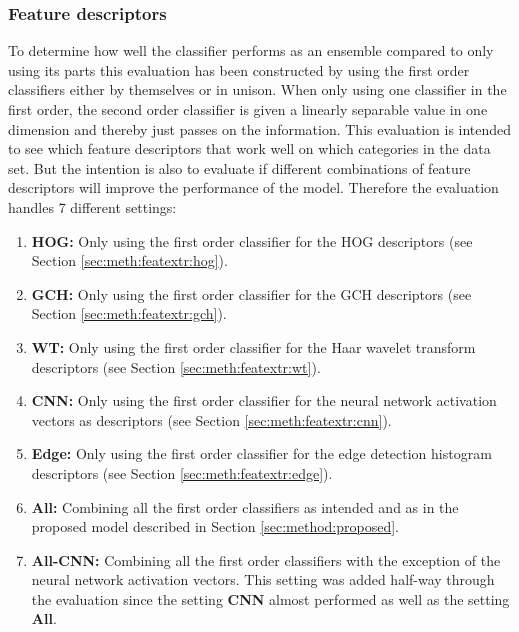 \subsubsection{Feature descriptors}
\label{sec:method:eval:param:features}
To determine how well the classifier performs as an ensemble compared to only using its parts this evaluation has been constructed by using the first order classifiers either by themselves or in unison. When only using one classifier in the first order, the second order classifier is given a linearly separable value in one dimension and thereby just passes on the information. This evaluation is intended to see which feature descriptors that work well on which categories in the data set. But the intention is also to evaluate if different combinations of feature descriptors will improve the performance of the model. 
Therefore the evaluation handles 7 different settings: 
\begin{enumerate}
	\item \textbf{HOG:} Only using the first order classifier for the HOG descriptors (see Section \ref{sec:meth:featextr:hog}).
	\item \textbf{GCH:} Only using the first order classifier for the GCH descriptors (see Section \ref{sec:meth:featextr:gch}).
	\item \textbf{WT:} Only using the first order classifier for the Haar wavelet transform descriptors (see Section \ref{sec:meth:featextr:wt}).
	\item \textbf{CNN:} Only using the first order classifier for the neural network activation vectors as descriptors (see Section \ref{sec:meth:featextr:cnn}).
	\item \textbf{Edge:} Only using the first order classifier for the edge detection histogram descriptors (see Section \ref{sec:meth:featextr:edge}).
	\item \textbf{All:} Combining all the first order classifiers as intended and as in the proposed model described in Section \ref{sec:method:proposed}. 
	\item \textbf{All-CNN:} Combining all the first order classifiers with the exception of the neural network activation vectors. This setting was added half-way through the evaluation since the setting \textbf{CNN} almost performed as well as the setting \textbf{All}.
\end{enumerate}